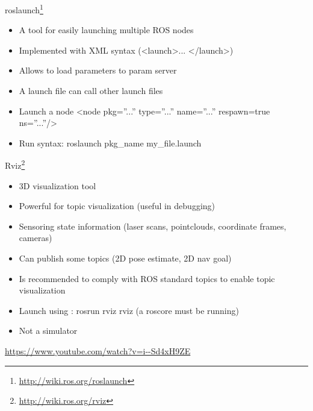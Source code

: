 \documentclass{beamer}
\begin{document}

\begin{frame}{roslaunch\footnote{\url{http://wiki.ros.org/roslaunch}}}
	
	\begin{itemize}
		\item A tool for easily launching multiple ROS nodes
		\item Implemented with XML syntax (\textless launch\textgreater ... \textless /launch\textgreater)
		\item Allows to load parameters to param server
		\item A launch file can call other launch files
		\item Launch a node \textless node pkg=”...” type=”...” name=”...” respawn=true ns=”...”/\textgreater
		\item Run syntax: roslaunch pkg\_name my\_file.launch
	\end{itemize}

\end{frame}


\begin{frame}{Rviz\footnote{\url{http://wiki.ros.org/rviz}}}
	
	\begin{itemize}
		\item 3D visualization tool
		\item Powerful for topic visualization (useful in debugging)
		\item Sensoring state information (laser scans, pointclouds, coordinate frames, cameras)
		\item Can publish some topics (2D pose estimate, 2D nav goal)
		\item Is recommended to comply with ROS standard topics to enable topic visualization
		\item Launch using : rosrun rviz rviz (a roscore must be running)
		\item Not a simulator
	\end{itemize}
	
	\centering
	\url{https://www.youtube.com/watch?v=i--Sd4xH9ZE}
	
\end{frame}


%	
%	
\end{document}
